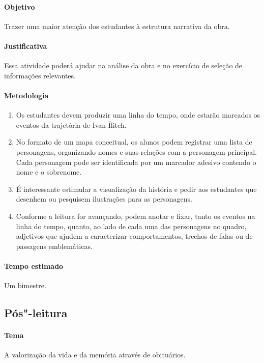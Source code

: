 \documentclass[12pt]{extarticle}
\begin{document}
\paragraph{Objetivo} Trazer uma maior atenção dos estudantes à estrutura
narrativa da obra.

\paragraph{Justificativa} Essa atividade poderá ajudar na análise 
da obra e no exercício de seleção de informações relevantes.

\paragraph{Metodologia}

\begin{enumerate}

\item Os estudantes devem produzir uma linha do
tempo, onde estarão marcados os eventos da trajetória de Ivan Ílitch.

\item No formato de um mapa conceitual, os alunos podem 
registrar uma lista de personagens, organizando nomes e suas
relações com a personagem principal. Cada personagem pode ser
identificada por um marcador adesivo contendo o nome e o sobrenome.

\item É interessante estimular a visualização da história e pedir aos estudantes
que desenhem ou pesquisem ilustrações para as personagens.

\item Conforme a leitura for avançando, podem anotar e fixar, 
tanto os eventos na linha do tempo, quanto, ao lado 
de cada uma das personagens no quadro, adjetivos
que ajudem a caracterizar comportamentos, trechos de falas ou de
passagens emblemáticas.

\end{enumerate}

\paragraph{Tempo estimado} Um bimestre.


\subsection{Pós"-leitura}

\paragraph{Tema} A valorização da vida e da memória através de obituários.
\end{document}
